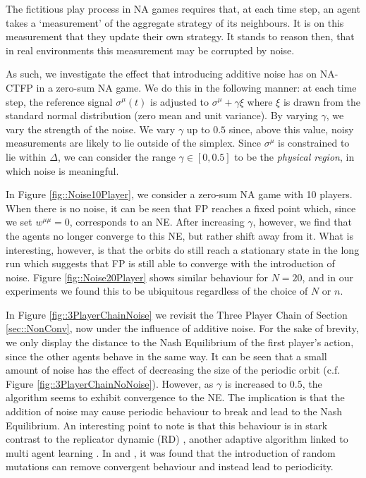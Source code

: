 \documentclass{article}
\theoremstyle{definition}
\newcommand{\refmu}{\sigma^{\mu}}
\begin{document}
  The fictitious play process in NA games requires that, at each time step, an agent takes a
  `measurement' of the aggregate strategy of its neighbours. It is on this measurement that they
  update their own strategy. It stands to reason then, that in real environments this measurement
  may be corrupted by noise. 
  
  As such, we investigate the effect that introducing additive noise has
  on NA-CTFP in a zero-sum NA game. We do this in the following manner: at each time step, the
  reference signal $\refmu(t)$ is adjusted to $\refmu + \gamma \xi$ where $\xi$ is drawn from the
  standard normal distribution (zero mean and unit variance). By varying $\gamma$, we vary the
  strength of the noise. We vary $\gamma$ up to $0.5$ since, above this value, noisy measurements
  are likely to lie outside of the simplex. Since $\refmu$ is constrained to lie within $\Delta$, we
  can consider the range $\gamma \in [0, 0.5]$ to be the \emph{physical region}, in which noise is meaningful.

  In Figure \ref{fig::Noise10Player}, we consider a zero-sum NA game with 10 players. When there is
  no noise, it can be seen that FP reaches a fixed point which, since we set $w^{\mu \mu} = 0$,
  corresponds to an NE. After increasing $\gamma$, however, we find that the agents no longer
  converge to this NE, but rather shift away from it. What is interesting, however, is that the
  orbits do still reach a stationary state in the long run which suggests that FP is still able to
  converge with the introduction of noise. Figure \ref{fig::Noise20Player} shows similar behaviour
  for $N = 20$, and in our experiments we found this to be ubiquitous regardless of the choice of
  $N$ or $n$. 

  In Figure \ref{fig::3PlayerChainNoise} we revisit the Three Player Chain of Section
  \ref{sec::NonConv}, now under the influence of additive noise. For the sake of brevity, we only
  display the distance to the Nash Equilibrium of the first player's action, since the other agents
  behave in the same way. It can be seen that a small amount of noise has the effect of decreasing
  the size of the periodic orbit (c.f. Figure \ref{fig::3PlayerChainNoNoise}). However, as $\gamma$
  is increased to $0.5$, the algorithm seems to exhibit convergence to the NE. The implication is
  that the addition of noise may cause periodic behaviour to break and lead to the Nash Equilibrium.
  An interesting point to note is that this behaviour is in stark contrast to the replicator
  dynamic (RD) \cite{Maynard-Smith}, another adaptive algorithm linked to multi agent learning
  \cite{CyclesAdversarialLearning}. In \cite{Imhof} and \cite{Galla}, it was found that the
  introduction of random mutations can remove convergent behaviour and instead lead to periodicity. 
  
\end{document}
